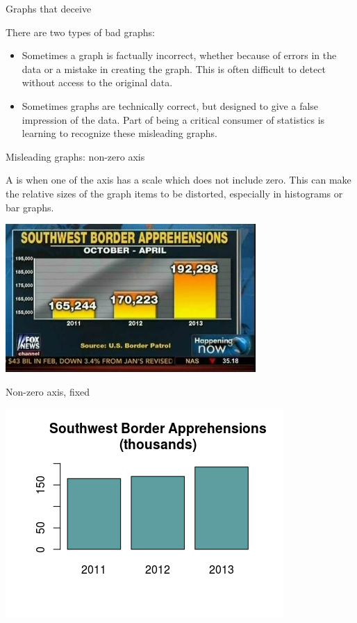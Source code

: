 \documentclass[handout]{beamer}
\begin{document}
\begin{frame}{Graphs that deceive}
\begin{block}{}
There are two types of bad graphs:
\begin{itemize}
\item Sometimes a graph is factually incorrect, whether because of errors in the data or a mistake in creating the graph. This is often difficult to detect without access to the original data.
\item Sometimes graphs are technically correct, but designed to give a false impression of the data. Part of being a critical consumer of statistics is learning to recognize these misleading graphs.
\end{itemize}
\end{block}
\end{frame}

\begin{frame}{Misleading graphs: non-zero axis}
\begin{block}{}
A  is when one of the axis has a scale which does not include zero. This can make the relative sizes of the graph items to be distorted, especially in histograms or bar graphs.
\end{block}
\pause
\begin{center}
\includegraphics[width=3.75in]{../images/ch02_bad_nonzero}\par
\end{center}
\end{frame}

\begin{frame}{Non-zero axis, fixed}
\begin{center}
\includegraphics{../images/ch02_bad_nonzero_fixed} 
\end{center}
\end{frame}
\end{document}
